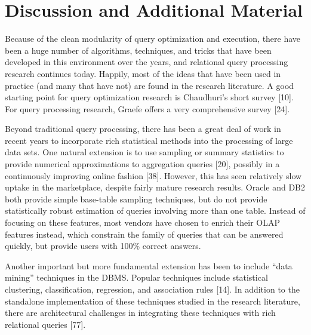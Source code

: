 \documentclass[b5paper,11pt,twoside,openright]{book}
\begin{document}
\hypertarget{discussion-and-additional-material-2}{%
\section{Discussion and Additional
Material}\label{discussion-and-additional-material-2}}

Because of the clean modularity of query optimization and execution,
there have been a huge number of algorithms, techniques, and tricks that
have been developed in this environment over the years, and relational
query processing research continues today. Happily, most of the ideas
that have been used in practice (and many that have not) are found in
the research literature. A good starting point for query optimization
research is Chaudhuri's short survey {[}10{]}. For query processing
research, Graefe offers a very comprehensive survey {[}24{]}.

Beyond traditional query processing, there has been a great deal of work
in recent years to incorporate rich statistical methods into the
processing of large data sets. One natural extension is to use sampling
or summary statistics to provide numerical approximations to aggregation
queries {[}20{]}, possibly in a continuously improving online fashion {[}38{]}.
However, this has seen relatively slow uptake in the marketplace,
despite fairly mature research results. Oracle and DB2 both provide
simple base-table sampling techniques, but do not provide
statistically robust estimation of queries involving more than one
table. Instead of focusing on these features, most vendors have chosen
to enrich their OLAP features instead, which constrain the family of
queries that can be answered quickly, but provide users with 100\%
correct answers.

Another important but more fundamental extension has been to include
``data mining'' techniques in the DBMS. Popular techniques include
statistical clustering, classification, regression, and association
rules {[}14{]}. In addition to the standalone implementation of these
techniques studied in the research literature, there are architectural
challenges in integrating these techniques with rich relational queries
{[}77{]}.
\end{document}
